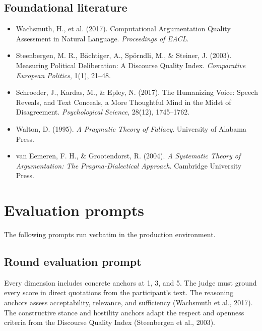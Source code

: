 \documentclass[11pt]{article}
\begin{document}
\subsection*{Foundational literature}
\begin{itemize}[nosep]
  \item Wachsmuth, H., et al. (2017). Computational Argumentation Quality Assessment in Natural Language. \emph{Proceedings of EACL}.
  \item Steenbergen, M. R., B\"achtiger, A., Sp\"orndli, M., \& Steiner, J. (2003). Measuring Political Deliberation: A Discourse Quality Index. \emph{Comparative European Politics}, 1(1), 21--48.
  \item Schroeder, J., Kardas, M., \& Epley, N. (2017). The Humanizing Voice: Speech Reveals, and Text Conceals, a More Thoughtful Mind in the Midst of Disagreement. \emph{Psychological Science}, 28(12), 1745--1762.
  \item Walton, D. (1995). \emph{A Pragmatic Theory of Fallacy}. University of Alabama Press.
  \item van Eemeren, F. H., \& Grootendorst, R. (2004). \emph{A Systematic Theory of Argumentation: The Pragma-Dialectical Approach}. Cambridge University Press.
\end{itemize}

\appendix

\section{Evaluation prompts}
\label{sec:prompts}

The following prompts run verbatim in the production environment.

\subsection{Round evaluation prompt}

Every dimension includes concrete anchors at 1, 3, and 5. The judge must ground every score in direct quotations from the participant's text. The reasoning anchors assess acceptability, relevance, and sufficiency (Wachsmuth et al., 2017). The constructive stance and hostility anchors adapt the respect and openness criteria from the Discourse Quality Index (Steenbergen et al., 2003).
\end{document}
